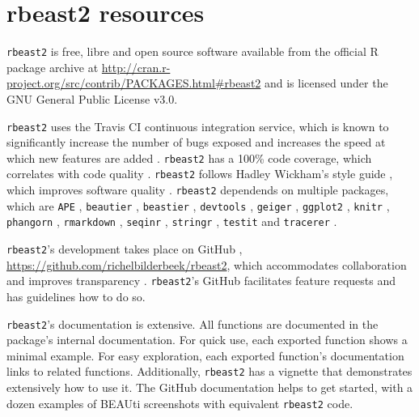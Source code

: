 \documentclass{article}
\begin{document}
\section{rbeast2 resources}

\verb;rbeast2; is free, libre and open source software available 
from the official R package archive at 
\url{http://cran.r-project.org/src/contrib/PACKAGES.html\#rbeast2}
and is licensed under the GNU General Public License v3.0.

\verb;rbeast2; uses the Travis CI \cite{travis} 
continuous integration service, which is known to significantly 
increase the number of bugs exposed \cite{vasilescu2015} and increases
the speed at which new features are added \cite{vasilescu2015}.
\verb;rbeast2; has a 100\% code coverage, which correlates with code quality \cite{horgan1994,del1995correlation}. 
\verb;rbeast2; follows Hadley Wickham's style guide \cite{style_guide}, 
which improves software quality \cite{fang2001}.
\verb;rbeast2; dependends on multiple packages, which are 
\verb;APE; \cite{APE}, 
\verb;beautier; \cite{beautier},
\verb;beastier; \cite{beastier},
\verb;devtools; \cite{devtools},
\verb;geiger; \cite{GEIGER},
\verb;ggplot2; \cite{ggplot2},
\verb;knitr; \cite{knitr},
\verb;phangorn; \cite{phangorn},
\verb;rmarkdown; \cite{rmarkdown},
\verb;seqinr; \cite{seqinr},
\verb;stringr; \cite{stringr},
\verb;testit; \cite{testit} and 
\verb;tracerer; \cite{tracerer}.

\verb;rbeast2;'s development takes place on GitHub \cite{github},
\url{https://github.com/richelbilderbeek/rbeast2}, 
which accommodates collaboration \cite{perez2016ten} 
and improves transparency \cite{gorgolewski2016practical}.
\verb;rbeast2;'s GitHub facilitates feature requests and has guidelines how to do so.

\verb;rbeast2;'s documentation is extensive. All functions are documented
in the package's internal documentation. For quick use, 
each exported function shows a minimal example. 
For easy exploration, each exported function's documentation links to related functions.
Additionally, \verb;rbeast2; has a vignette that demonstrates extensively how
to use it. The GitHub documentation helps to get started, with a dozen examples 
of BEAUti screenshots with equivalent \verb;rbeast2; code.

\end{document}

